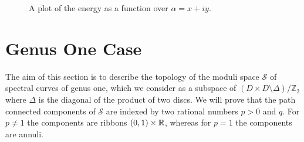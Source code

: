 \documentclass{article}
\begin{document}
\begin{center}
\begin{figure}
\caption{
A plot of the energy as a function over $\alpha = x + i y$.}
\end{figure}
\end{center}


































\section{Genus One Case}
\label{sec:Genus One Case}

The aim of this section is to describe the topology of the moduli space $\mathcal{S}$ of spectral curves of genus one, which we consider as a subspace of $(D\times D\setminus \Delta)/\mathbb{Z}_2$ where $\Delta$ is the diagonal of the product of two discs. 
We will prove that the path connected components of $\mathcal{S}$ are indexed by two rational numbers $p > 0$ and $q$. For $p\neq 1$ the components are ribbons $(0,1)\times \mathbb{R}$, whereas for $p=1$ the components are annuli.
\end{document}
